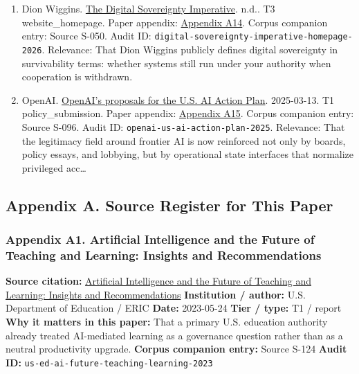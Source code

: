 \documentclass[
  american,
  11pt,
  letterpaper,
]{article}
\begin{document}
\begin{enumerate}
  Meta.
  \href{https://about.fb.com/news/2023/03/mark-zuckerberg-meta-year-of-efficiency/}{Mark
  Zuckerberg's Message to Meta Employees}. 2023-03-14. T1
  company\_statement. Paper appendix:
  \hyperref[ch-09-appendix-a13-mark-zuckerberg-s-message-to-meta-employees]{Appendix
  A13}. Corpus companion entry: Source S-082. Audit ID:
  \texttt{meta-year-of-efficiency-2023}. Relevance: Supports a key
  factual or interpretive move inside this paper.
\item
  Dion Wiggins. \href{https://digitalsovereigntyimperative.com/}{The
  Digital Sovereignty Imperative}. n.d.. T3 website\_homepage. Paper
  appendix:
  \hyperref[ch-09-appendix-a14-the-digital-sovereignty-imperative]{Appendix
  A14}. Corpus companion entry: Source S-050. Audit ID:
  \texttt{digital-sovereignty-imperative-homepage-2026}. Relevance: That
  Dion Wiggins publicly defines digital sovereignty in survivability
  terms: whether systems still run under your authority when cooperation
  is withdrawn.
\item
  OpenAI.
  \href{https://openai.com/global-affairs/openai-proposals-for-the-us-ai-action-plan/}{OpenAI's
  proposals for the U.S. AI Action Plan}. 2025-03-13. T1
  policy\_submission. Paper appendix:
  \hyperref[ch-09-appendix-a15-openais-proposals-for-the-us-ai-action-plan]{Appendix
  A15}. Corpus companion entry: Source S-096. Audit ID:
  \texttt{openai-us-ai-action-plan-2025}. Relevance: That the legitimacy
  field around frontier AI is now reinforced not only by boards, policy
  essays, and lobbying, but by operational state interfaces that
  normalize privileged acc\ldots{}
\end{enumerate}

\subsection{Appendix A. Source Register for This
Paper}\label{appendix-a.-source-register-for-this-paper-9}

\subsubsection{Appendix A1. Artificial Intelligence and the Future of
Teaching and Learning: Insights and
Recommendations}\label{ch-09-appendix-a1-artificial-intelligence-and-the-future-of-teaching-and-learning-insights-and-recommendations}

\textbf{Source citation:}
\href{https://eric.ed.gov/?id=ED631097}{Artificial Intelligence and the
Future of Teaching and Learning: Insights and Recommendations}
\textbf{Institution / author:} U.S. Department of Education / ERIC
\textbf{Date:} 2023-05-24 \textbf{Tier / type:} T1 / report \textbf{Why
it matters in this paper:} That a primary U.S. education authority
already treated AI-mediated learning as a governance question rather
than as a neutral productivity upgrade. \textbf{Corpus companion entry:}
Source S-124 \textbf{Audit ID:}
\texttt{us-ed-ai-future-teaching-learning-2023}
\end{document}
